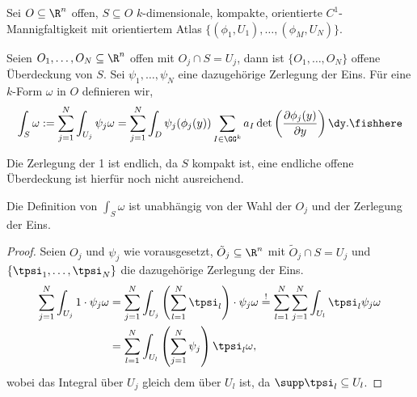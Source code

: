 \begin{defn}
\label{defn:4.51}
Sei $O\subseteq \R^n$ offen, $S\subseteq O$ $k$-dimensionale, kompakte,
orientierte $C^1$-Mannigfaltigkeit mit orientiertem Atlas
$\{(\phi_1,U_1),\ldots,(\phi_M,U_N)\}$.

Seien $O_1,\ldots,O_N\subseteq \R^n$ offen mit $O_j\cap S = U_j$, dann ist
$\{O_1,\ldots,O_N\}$ offene Überdeckung von $S$. Sei $\psi_1,\ldots, \psi_N$
eine dazugehörige Zerlegung der Eins. Für eine $k$-Form $\omega$ in $O$
definieren wir,
\begin{align*}
\int_S \omega := \sum\limits_{j=1}^N \int_{U_j} \psi_j \omega
= \sum\limits_{j=1}^N \int_D \psi_j(\phi_j(y)) \sum\limits_{I\in\GG^k} a_I
\det\left(\frac{\partial \phi_j(y)}{\partial y} \right) \dy.\fishhere
\end{align*}
\end{defn}

\begin{bemn}
Die Zerlegung der 1 ist endlich, da $S$ kompakt ist,
eine endliche offene Überdeckung ist hierfür noch nicht ausreichend.\maphere
\end{bemn}

\begin{prop}
\label{prop:4.52}
Die Definition von $\int_S \omega$ ist unabhängig von der Wahl der $O_j$ und
der Zerlegung der Eins.\fishhere
\end{prop}
\begin{proof}
Seien $O_j$ und $\psi_j$ wie vorausgesetzt, $\tilde{O}_j\subseteq\R^n$
mit $\tilde{O}_j\cap S = U_j$ und $\{\tpsi_1,\ldots,\tpsi_N\}$ die dazugehörige Zerlegung der Eins.
\begin{align*}
\sum\limits_{j=1}^N \int_{U_j} 1\cdot\psi_j \omega
&= \sum\limits_{j=1}^N \int_{U_j} \left(\sum\limits_{l=1}^N \tpsi_l \right)
\cdot\psi_j\omega
\overset{!}{=} \sum\limits_{l=1}^N\sum\limits_{j=1}^N \int_{U_l} \tpsi_l\psi_j \omega
\\ &= \sum\limits_{l=1}^N\int_{U_l}
\left(\sum\limits_{j=1}^N \psi_j \right)\tpsi_l \omega,
\end{align*}
wobei das Integral über $U_j$ gleich dem über $U_l$ ist, da $\supp \tpsi_l
\subseteq U_l$.\qedhere
\end{proof}

